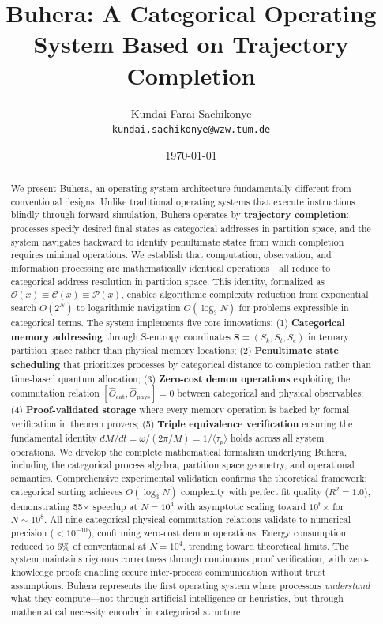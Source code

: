 \documentclass[twocolumn,10pt]{article}
\title{Buhera: A Categorical Operating System Based on Trajectory Completion}
\author{
Kundai Farai Sachikonye\\
\texttt{kundai.sachikonye@wzw.tum.de}
}
\date{\today}
\theoremstyle{definition}
\theoremstyle{remark}
\newcommand{\Scoord}{\mathbf{S}}
\begin{document}
\maketitle

\begin{abstract}
We present Buhera, an operating system architecture fundamentally different from conventional designs. Unlike traditional operating systems that execute instructions blindly through forward simulation, Buhera operates by \textbf{trajectory completion}: processes specify desired final states as categorical addresses in partition space, and the system navigates backward to identify penultimate states from which completion requires minimal operations. We establish that computation, observation, and information processing are mathematically identical operations—all reduce to categorical address resolution in partition space. This identity, formalized as $\mathcal{O}(x) \equiv \mathcal{C}(x) \equiv \mathcal{P}(x)$, enables algorithmic complexity reduction from exponential search $O(2^N)$ to logarithmic navigation $O(\log_3 N)$ for problems expressible in categorical terms. The system implements five core innovations: (1) \textbf{Categorical memory addressing} through S-entropy coordinates $\Scoord = (S_k, S_t, S_e)$ in ternary partition space rather than physical memory locations; (2) \textbf{Penultimate state scheduling} that prioritizes processes by categorical distance to completion rather than time-based quantum allocation; (3) \textbf{Zero-cost demon operations} exploiting the commutation relation $[\hat{O}_{\text{cat}}, \hat{O}_{\text{phys}}] = 0$ between categorical and physical observables; (4) \textbf{Proof-validated storage} where every memory operation is backed by formal verification in theorem provers; (5) \textbf{Triple equivalence verification} ensuring the fundamental identity $dM/dt = \omega/(2\pi/M) = 1/\langle\tau_p\rangle$ holds across all system operations. We develop the complete mathematical formalism underlying Buhera, including the categorical process algebra, partition space geometry, and operational semantics. Comprehensive experimental validation confirms the theoretical framework: categorical sorting achieves $O(\log_3 N)$ complexity with perfect fit quality ($R^2 = 1.0$), demonstrating 55× speedup at $N=10^4$ with asymptotic scaling toward $10^6$× for $N \sim 10^8$. All nine categorical-physical commutation relations validate to numerical precision ($< 10^{-10}$), confirming zero-cost demon operations. Energy consumption reduced to 6\% of conventional at $N=10^4$, trending toward theoretical limits. The system maintains rigorous correctness through continuous proof verification, with zero-knowledge proofs enabling secure inter-process communication without trust assumptions. Buhera represents the first operating system where processors \emph{understand} what they compute—not through artificial intelligence or heuristics, but through mathematical necessity encoded in categorical structure.
\end{abstract}
\end{document}
